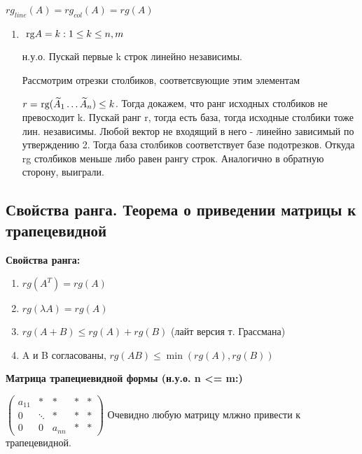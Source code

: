 \( rg_{line}(A) = rg_{col}(A) = rg(A) \)
\begin{enumerate}
    \item[] \prooff{}
    $\rg A = k: 1 \leq k \leq n,m$

    н.у.о. Пускай первые k строк линейно независимы.
    
    Рассмотрим отрезки столбиков, соответсвующие этим элементам

    $r = \rg (\widetilde{A}_1 \ldots \widetilde{A}_n) \leq k$. Тогда докажем, что ранг исходных столбиков не превосходит k. Пускай ранг r, тогда есть база, тогда исходные столбики  тоже лин. независимы. Любой вектор не входящий в него - линейно зависимый по утверждению 2. Тогда база столбиков соответствует базе подотрезков. Откуда rg столбиков меньше либо равен рангу строк. Аналогично в обратную сторону, выиграли.
\end{enumerate}

\subsection{Свойства ранга. Теорема о приведении матрицы к трапецевидной}

\textbf{Свойства ранга:}
\begin{enumerate}
    \item $ rg(A^T) = rg(A) $
    \item $ rg(\lambda A) = rg(A) $
    \item $ rg(A+B) \leq rg(A)+rg(B) $ (лайт версия т. Грассмана)
    \item A и B согласованы, $ rg(AB) \leq \min(rg(A),rg(B)) $
\end{enumerate}

\textbf{Матрица трапециевидной формы (н.у.о. n <= m:)}

\(
\begin{pmatrix}
    a_{11} & *      & *      & * & * \\
    0      & \ddots & *      & * & * \\
    0      & 0      & a_{nn} & * & *
\end{pmatrix}
\) 
Очевидно любую матрицу млжно привести к трапецевидной.


